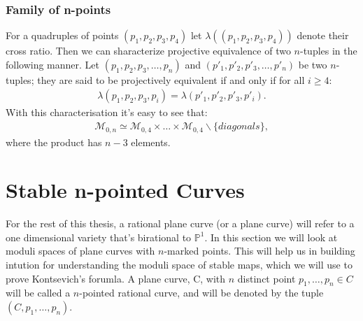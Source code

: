 \subsubsection{Family of n-points}
For a quadruples of points $(p_{1}, p_{2}, p_{3}, p_{4})$ let $\lambda((p_{1}, p_{2}, p_{3}, p_{4}))$ denote their cross ratio.
Then we can sharacterize projective equivalence of two $n$-tuples in the following manner.
Let $(p_{1}, p_{2}, p_{3},\dots,p_{n})$ and $(p'_{1}, p'_{2}, p'_{3},\dots,p'_{n})$ be two $n$-tuples; they are said to be projectively equivalent if and only if for all $i\geq 4$:
\begin{align*}
     \lambda(p_{1}, p_{2}, p_{3}, p_{i}) = \lambda(p'_{1}, p'_{2}, p'_{3}, p'_{i}).
\end{align*}
With this characterisation it's easy to see that:
\begin{align*}
    \mathcal{M}_{0,n} \simeq \mathcal{M}_{0,4} \times \dots \times \mathcal{M}_{0,4} \backslash\{diagonals\},
\end{align*}
where the product has $n-3$ elements.

\section{Stable n-pointed Curves}
For the rest of this thesis, a rational plane curve (or a plane curve) will refer to a one dimensional variety that's birational to $\mathbb{P}^{1}$. 
In this section we will look at moduli spaces of plane curves with $n$-marked points.
This will help us in building intution for understanding the moduli space of stable maps, which we will use to prove Kontsevich's forumla.
A plane curve, C, with $n$ distinct point $p_{1},\dots, p_{n} \in C$ will be called a $n$-pointed rational curve, and will be denoted by the tuple $(C, p_{1}, \dots, p_{n})$.

